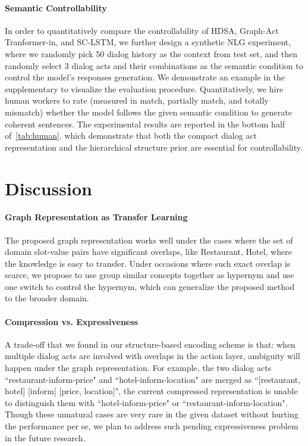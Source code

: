 \documentclass[11pt,a4paper]{article}
\begin{document}
\paragraph{Semantic Controllability}\label{sec:controllability} In order to quantitatively compare the controllability of HDSA, Graph-Act Tranformer-in, and SC-LSTM, we further design a synthetic NLG experiment, where we randomly pick 50 dialog history as the context from test set, and then randomly select 3 dialog acts and their combinations as the semantic condition to control the model's responses generation. We demonstrate an example in the supplementary to visualize the evaluation procedure. Quantitatively, we hire human workers to rate (measured in match, partially match, and totally mismatch) whether the model follows the given semantic condition to generate coherent sentences. The experimental results are reported in the bottom half of~\autoref{tab:human}, which demonstrate that both the compact dialog act representation and the hierarchical structure prior are essential for controllability.

\section{Discussion}
\paragraph{Graph Representation as Transfer Learning}
The proposed graph representation works well under the cases where the set of domain slot-value pairs have significant overlaps, like Restaurant, Hotel, where the knowledge is easy to transfer. Under occasions where such exact overlap is scarce, we propose to use group similar concepts together as hypernym and use one switch to control the hypernym, which can generalize the proposed method to the broader domain. 
\paragraph{Compression vs. Expressiveness}
A trade-off that we found in our structure-based encoding scheme is that: when multiple dialog acts are involved with overlaps in the action layer, ambiguity will happen under the graph representation. For example, the two dialog acts ``restaurant-inform-price" and  ``hotel-inform-location" are merged as ``[restaurant, hotel]  [inform]  [price, location]", the current compressed representation is unable to distinguish them with ``hotel-inform-price" or ``restaurant-inform-location". Though these unnatural cases are very rare in the given dataset without hurting the performance per se, we plan to address such pending expressiveness problem in the future research.
\end{document}
